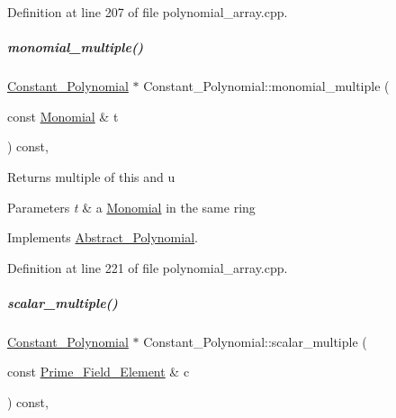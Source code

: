 Definition at line 207 of file polynomial\+\_\+array.\+cpp.

\mbox{\label{group__polygroup_ae0af1a1cf7c7eed390b25a951a685da2}} 
\subparagraph{\texorpdfstring{monomial\+\_\+multiple()}{monomial\_multiple()}}
{\footnotesize\ttfamily \hyperlink{group__polygroup_class_constant___polynomial}{Constant\+\_\+\+Polynomial} $\ast$ Constant\+\_\+\+Polynomial\+::monomial\+\_\+multiple (\begin{DoxyParamCaption}\item[{const \hyperlink{group__polygroup_class_monomial}{Monomial} \&}]{t }\end{DoxyParamCaption}) const\hspace{0.3cm}{\ttfamily [override]}, {\ttfamily [virtual]}}

\begin{DoxyReturn}{Returns}
multiple of {\ttfamily this} and {\ttfamily u} 
\end{DoxyReturn}

\begin{DoxyParams}{Parameters}
{\em t} & a \hyperlink{group__polygroup_class_monomial}{Monomial} in the same ring \\
\hline
\end{DoxyParams}


Implements \hyperlink{group__polygroup_aacee94ef63116201c91c7d65779097d8}{Abstract\+\_\+\+Polynomial}.



Definition at line 221 of file polynomial\+\_\+array.\+cpp.

\mbox{\label{group__polygroup_afd8bdd523c36fbde64df0bf36a0f4e77}} 
\subparagraph{\texorpdfstring{scalar\+\_\+multiple()}{scalar\_multiple()}}
{\footnotesize\ttfamily \hyperlink{group__polygroup_class_constant___polynomial}{Constant\+\_\+\+Polynomial} $\ast$ Constant\+\_\+\+Polynomial\+::scalar\+\_\+multiple (\begin{DoxyParamCaption}\item[{const \hyperlink{group___fields_group_class_prime___field___element}{Prime\+\_\+\+Field\+\_\+\+Element} \&}]{c }\end{DoxyParamCaption}) const\hspace{0.3cm}{\ttfamily [override]}, {\ttfamily [virtual]}}

